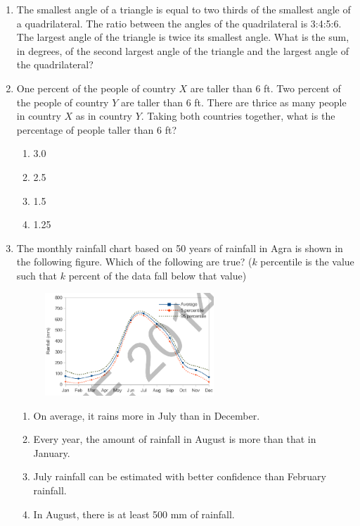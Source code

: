 \documentclass[journal,12pt,onecolumn]{IEEEtran}
\theoremstyle{remark}
\begin{document}
\begin{enumerate}
\item The smallest angle of a triangle is equal to two thirds of the smallest angle of a quadrilateral. The ratio between the angles of the quadrilateral is 3:4:5:6. The largest angle of the triangle is twice its smallest angle. What is the sum, in degrees, of the second largest angle of the triangle and the largest angle of the quadrilateral?

\item One percent of the people of country $X$ are taller than 6 ft. Two percent of the people of country $Y$ are taller than 6 ft. There are thrice as many people in country $X$ as in country $Y$. Taking both countries together, what is the percentage of people taller than 6 ft?
\begin{enumerate}

    \item 3.0
    \item 2.5
    \item 1.5
    \item 1.25
\end{enumerate}

\item The monthly rainfall chart based on 50 years of rainfall in Agra is shown in the following figure. Which of the following are true? ($k$ percentile is the value such that $k$ percent of the data fall below that value)
\begin{figure}[h]
\centering
\includegraphics[width=0.6\textwidth]{figs/rainfall_graph.png}
\end{figure}



\begin{enumerate}
    \item On average, it rains more in July than in December.
    \item Every year, the amount of rainfall in August is more than that in January.
    \item July rainfall can be estimated with better confidence than February rainfall.
    \item In August, there is at least 500 mm of rainfall.
\end{enumerate}


\end{enumerate}
\end{document}
